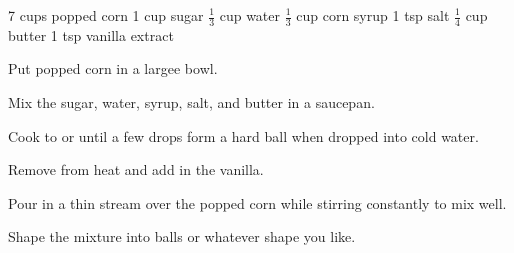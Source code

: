 \dishtype{\dessert}
\dishother{\vegetarian}
\begin{ingreds}
    7 cups popped corn
    1 cup sugar
    $\frac{1}{3}$ cup water
    $\frac{1}{3}$ cup corn syrup
    1 tsp salt
    $\frac{1}{4}$ cup butter
    1 tsp vanilla extract
\end{ingreds}
\begin{method}
    Put popped corn in a largee bowl.\par
    Mix the sugar, water, syrup, salt, and butter in a saucepan.\par
    Cook to  or until a few drops form a hard ball when dropped into cold water.\par
    Remove from heat and add in the vanilla.\par
    Pour in a thin stream over the popped corn while stirring constantly to mix well.\par
    Shape the mixture into balls or whatever shape you like.
\end{method}
